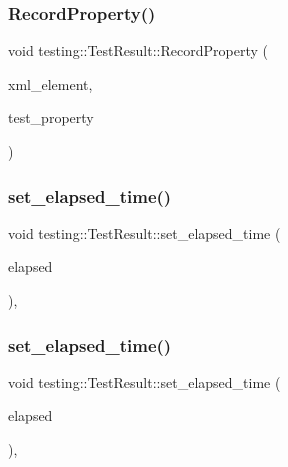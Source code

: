 \subsubsection{\texorpdfstring{RecordProperty()}{RecordProperty()}\hspace{0.1cm}{\footnotesize\ttfamily [3/3]}}
{\footnotesize\ttfamily void testing\+::\+Test\+Result\+::\+Record\+Property (\begin{DoxyParamCaption}\item[{const std\+::string \&}]{xml\+\_\+element,  }\item[{const \mbox{\hyperlink{classtesting_1_1_test_property}{Test\+Property}} \&}]{test\+\_\+property }\end{DoxyParamCaption})\hspace{0.3cm}{\ttfamily [private]}}

\mbox{\label{classtesting_1_1_test_result_aa345325e5dea41609d17d7c614bf2b18}} 
\subsubsection{\texorpdfstring{set\_elapsed\_time()}{set\_elapsed\_time()}\hspace{0.1cm}{\footnotesize\ttfamily [1/3]}}
{\footnotesize\ttfamily void testing\+::\+Test\+Result\+::set\+\_\+elapsed\+\_\+time (\begin{DoxyParamCaption}\item[{\mbox{\hyperlink{namespacetesting_a992de1d091ce660f451d1e8b3ce30fd6}{Time\+In\+Millis}}}]{elapsed }\end{DoxyParamCaption})\hspace{0.3cm}{\ttfamily [inline]}, {\ttfamily [private]}}

\mbox{\label{classtesting_1_1_test_result_aa345325e5dea41609d17d7c614bf2b18}} 
\subsubsection{\texorpdfstring{set\_elapsed\_time()}{set\_elapsed\_time()}\hspace{0.1cm}{\footnotesize\ttfamily [2/3]}}
{\footnotesize\ttfamily void testing\+::\+Test\+Result\+::set\+\_\+elapsed\+\_\+time (\begin{DoxyParamCaption}\item[{\mbox{\hyperlink{namespacetesting_a992de1d091ce660f451d1e8b3ce30fd6}{Time\+In\+Millis}}}]{elapsed }\end{DoxyParamCaption})\hspace{0.3cm}{\ttfamily [inline]}, {\ttfamily [private]}}

